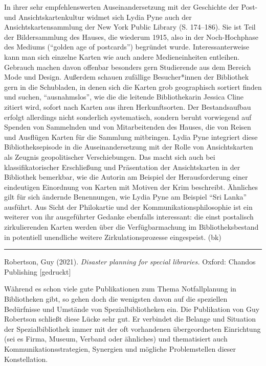 \documentclass[a4paper,
fontsize=11pt,
oneside,
numbers=noperiodatend,
parskip=half-,
bibliography=totoc,
final
]{scrartcl}
\begin{document}
In ihrer sehr empfehlenswerten Auseinandersetzung mit der Geschichte der
Post- und Ansichtskartenkultur widmet sich Lydia Pyne auch der
Ansichtskartensammlung der New York Public Library (S. 174--186). Sie
ist Teil der Bildersammlung des Hauses, die wiederum 1915, also in der
Noch-Hochphase des Mediums (\enquote{golden age of postcards}) begründet
wurde. Interessanterweise kann man sich einzelne Karten wie auch andere
Medieneinheiten entleihen. Gebrauch machen davon offenbar besonders gern
Studierende aus dem Bereich Mode und Design. Außerdem schauen zufällige
Besucher*innen der Bibliothek gern in die Schubladen, in denen sich die
Karten grob geographisch sortiert finden und suchen,
\enquote{ausnahmslos}, wie die die leitende Bibliothekarin Jessica Cline
zitiert wird, sofort nach Karten aus ihren Herkunftsorten. Der
Bestandsaufbau erfolgt allerdings nicht sonderlich systematisch, sondern
beruht vorwiegend auf Spenden von Sammelnden und von Mitarbeitenden des
Hauses, die von Reisen und Ausflügen Karten für die Sammlung mitbringen.
Lydia Pyne integriert diese Bibliotheksepisode in die Auseinandersetzung
mit der Rolle von Ansichtskarten als Zeugnis geopolitischer
Verschiebungen. Das macht sich auch bei klassifikatorischer Erschließung
und Präsentation der Ansichtskarten in der Bibliothek bemerkbar, wie die
Autorin am Beispiel der Herausforderung einer eindeutigen Einordnung von
Karten mit Motiven der Krim beschreibt. Ähnliches gilt für sich ändernde
Benennungen, wie Lydia Pyne am Beispiel \enquote{Sri Lanka} ausführt.
Aus Sicht der Philokartie und der Kommunikationsphilosophie ist ein
weiterer von ihr ausgeführter Gedanke ebenfalls interessant: die einst
postalisch zirkulierenden Karten werden über die Verfügbarmachung im
Bibliotheksbestand in potentiell unendliche weitere Zirkulationsprozesse
eingespeist. (bk)

\begin{center}\rule{0.5\linewidth}{0.5pt}\end{center}

\pagebreak

Robertson, Guy (2021). \emph{Disaster planning for special libraries.}
Oxford: Chandos Publishing {[}gedruckt{]}

Während es schon viele gute Publikationen zum Thema Notfallplanung in
Bibliotheken gibt, so gehen doch die wenigsten davon auf die speziellen
Bedürfnisse und Umstände von Spezialbibliotheken ein. Die Publikation
von Guy Robertson schließt diese Lücke sehr gut. Er verbindet die
Belange und Situation der Spezialbibliothek immer mit der oft
vorhandenen übergeordneten Einrichtung (sei es Firma, Museum, Verband
oder ähnliches) und thematisiert auch Kommunikationsstrategien,
Synergien und mögliche Problemstellen dieser Konstellation.
\end{document}

